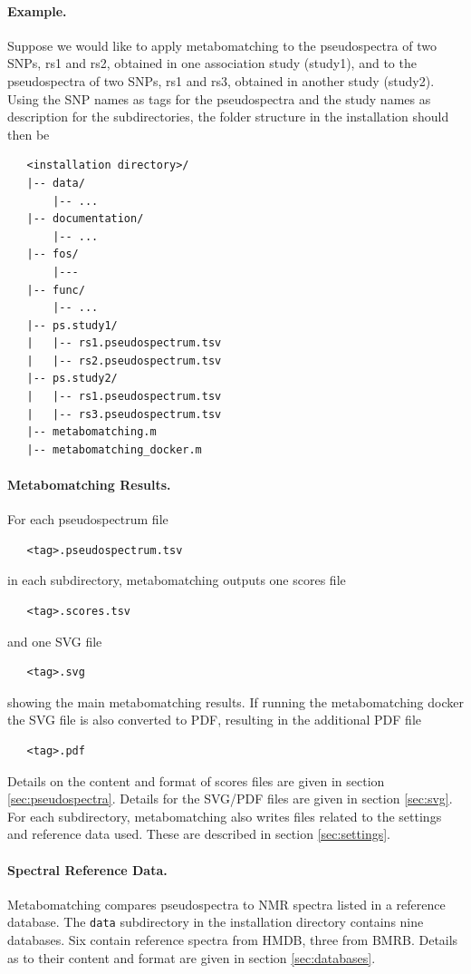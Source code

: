 \documentclass[a4paper,11pt]{article}
\begin{document}
\paragraph{Example.} Suppose we would like to apply metabomatching to the pseudospectra of two SNPs, rs1 and rs2, obtained in one association study (study1), and to the pseudospectra of two SNPs, rs1 and rs3, obtained in another study (study2). Using the SNP names as tags for the pseudospectra and the study names as description for the subdirectories, the folder structure in the installation should then be
\begin{verbatim}
   <installation directory>/
   |-- data/
       |-- ...
   |-- documentation/
       |-- ...
   |-- fos/
       |---
   |-- func/
       |-- ...
   |-- ps.study1/
   |   |-- rs1.pseudospectrum.tsv
   |   |-- rs2.pseudospectrum.tsv
   |-- ps.study2/
   |   |-- rs1.pseudospectrum.tsv
   |   |-- rs3.pseudospectrum.tsv
   |-- metabomatching.m
   |-- metabomatching_docker.m
\end{verbatim}
\paragraph{Metabomatching Results.} For each pseudospectrum file
\begin{verbatim}
   <tag>.pseudospectrum.tsv
\end{verbatim}
in each subdirectory, metabomatching outputs one scores file 
\begin{verbatim}
   <tag>.scores.tsv
\end{verbatim}
and one SVG file
\begin{verbatim}
   <tag>.svg
\end{verbatim}
showing the main metabomatching results. If running the metabomatching docker the SVG file is also converted to PDF, resulting in the additional PDF file
\begin{verbatim}
   <tag>.pdf
\end{verbatim}
 Details on the content and format of scores files are given in section \ref{sec:pseudospectra}. Details for the SVG/PDF files are given in section \ref{sec:svg}. For each subdirectory, metabomatching also writes files related to the settings and reference data used. These are described in section \ref{sec:settings}.
\paragraph{Spectral Reference Data.} Metabomatching compares pseudospectra to NMR spectra listed in a reference database. The \verb|data| subdirectory in the installation directory contains nine databases. Six contain reference spectra from HMDB, three from BMRB. Details as to their content and format are given in section \ref{sec:databases}.
\end{document}
